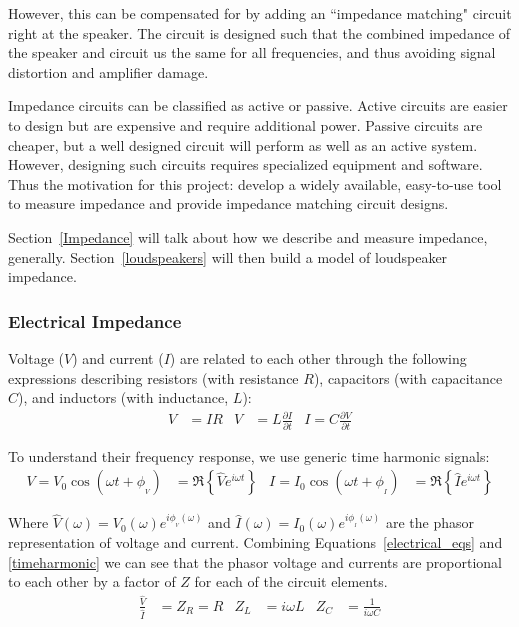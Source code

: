 \documentclass[10pt,letterpaper]{article}
\begin{document}
However, this can be compensated for by adding an ``impedance matching" circuit right at the speaker. The circuit is designed such that the combined impedance of the speaker and circuit us the same for all frequencies, and thus avoiding signal distortion and amplifier damage.

Impedance circuits can be classified as active or passive. Active circuits are easier to design but are expensive and require additional power. Passive circuits are cheaper, but a well designed circuit will perform as well as an active system. However, designing such circuits requires specialized equipment and software. Thus the motivation for this project: develop a widely available, easy-to-use tool to measure impedance and provide impedance matching circuit designs.

Section~\ref{Impedance} will talk about how we describe and measure impedance, generally. Section~\ref{loudspeakers} will then build a model of loudspeaker impedance.
\subsubsection{Electrical Impedance}
Voltage ($V$) and current ($I$) are related to each other through the following expressions describing resistors (with resistance $R$), capacitors (with capacitance $C$), and inductors (with inductance, $L$):
\begin{align}\label{electrical_eqs}
V&=IR & V&=L\frac{\partial I}{\partial t} & I=C\frac{\partial V}{\partial t}
\end{align}

To understand their frequency response, we use generic time harmonic signals:
\begin{align}\label{timeharmonic}
V=V_0\cos(\omega t + \phi_{_V})&=\Re{ \left\{ \hat{V}e^{i\omega t}\right\} } &
I=I_0\cos(\omega t + \phi_{_I})&=\Re{ \left\{ \hat{I}e^{i\omega t}\right\} }
\end{align}

Where $\hat{V}(\omega)=V_0(\omega)e^{i\phi_{_V}(\omega)}$ and $\hat{I}(\omega)=I_0(\omega)e^{i\phi_{_I}(\omega)}$ are the phasor representation of voltage and current. Combining Equations~\ref{electrical_eqs} and \ref{timeharmonic} we can see that the phasor voltage and currents are proportional to each other by a factor of $Z$ for each of the circuit elements.
\begin{align}
\frac{\hat{V}}{\hat{I}}&=Z_R=R & Z_L&=i\omega L & Z_C&=\frac{1}{i\omega C}
\end{align}
\end{document}
